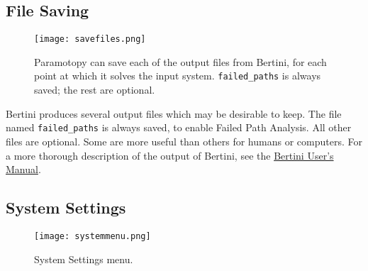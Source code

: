 \subsection{File Saving}


\begin{figure}[h]
\begin{center}
\texttt{[image: savefiles.png]}
\caption[File Saving]{Paramotopy can save each of the output files from Bertini, for each point at which it solves the input system.  \texttt{failed\_paths} is always saved; the rest are optional.}
\label{screen:savefilesmenu}
\end{center}
\end{figure}

Bertini produces several output files which may be desirable to keep.  The file named \texttt{failed\_paths} is always saved, to enable Failed Path Analysis.  All other files are optional.  Some are more useful than others for humans or computers.  For a more thorough description of the output of Bertini, see the \href{http://www.nd.edu/~sommese/bertini/BertiniUsersManual.pdf}{Bertini User's Manual}.







\subsection{System Settings}
\begin{figure}[h]
\begin{center}
\texttt{[image: systemmenu.png]}
\caption[General Settings Menu]{System Settings menu.}
\label{screen:systemmenu}
\end{center}
\end{figure}

